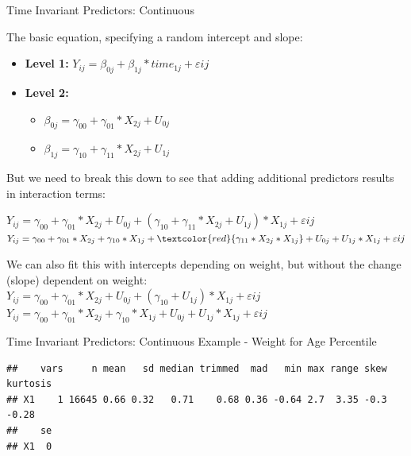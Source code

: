 \begin{frame}{Time Invariant Predictors: Continuous}

The basic equation, specifying a random intercept and slope:\\

\begin{itemize}
  \item \textbf{Level 1:} $Y_{ij} = \beta_{0j} + \beta_{1j}*time_{1j} + \varepsilon{ij}$
  \item \textbf{Level 2:} 
    \begin{itemize} 
      \item $\beta_{0j} = \gamma_{00} + \gamma_{01}*X_{2j} + U_{0j}$
      \item $\beta_{1j} = \gamma_{10} + \gamma_{11}*X_{2j} + U_{1j}$
    \end{itemize}
\end{itemize}

But we need to break this down to see that adding additional predictors
results in interaction terms:

\(Y_{ij} = \gamma_{00} + \gamma_{01}*X_{2j} + U_{0j} + (\gamma_{10} + \gamma_{11}*X_{2j} + U_{1j})*X_{1j} + \varepsilon{ij}\)
\(Y_{ij} = \gamma_{00} + \gamma_{01}*X_{2j} + \gamma_{10}*X_{1j} + \textcolor{red}{\gamma_{11}*X_{2j}*X_{1j}} + U_{0j} + U_{1j}*X_{1j} + \varepsilon{ij}\)

We can also fit this with intercepts depending on weight, but without
the change (slope) dependent on weight:\\
\(Y_{ij} = \gamma_{00} + \gamma_{01}*X_{2j} + U_{0j} + (\gamma_{10} + U_{1j})*X_{1j} + \varepsilon{ij}\)
\(Y_{ij} = \gamma_{00} + \gamma_{01}*X_{2j} + \gamma_{10}*X_{1j} + U_{0j} + U_{1j}*X_{1j} + \varepsilon{ij}\)

\end{frame}

\begin{frame}[fragile]{Time Invariant Predictors: Continuous Example -
Weight for Age Percentile}

\begin{Shaded}
\begin{Highlighting}[]
\OperatorTok{$}
\end{Highlighting}
\end{Shaded}

\footnotesize

\begin{verbatim}
##    vars     n mean   sd median trimmed  mad   min max range skew kurtosis
## X1    1 16645 0.66 0.32   0.71    0.68 0.36 -0.64 2.7  3.35 -0.3    -0.28
##    se
## X1  0
\end{verbatim}

\normalsize

\end{frame}


